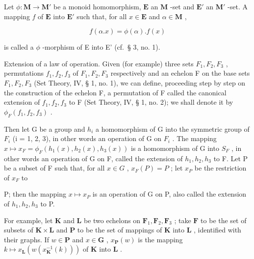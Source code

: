 Let \(\phi: \mathbf{M} \to \mathbf{M}'\) be a monoid homomorphism, \(\mathbf{E}\) an \(\mathbf{M}\) -set and \(\mathbf{E}'\) an \(\mathbf{M}'\) -set. A mapping \(f\) of \(\mathbf{E}\) into \(\mathbf{E}'\) such that, for all \(x \in \mathbf{E}\) and \(\alpha \in \mathbf{M}\) ,

\[
f (\alpha . x) = \phi (\alpha). f (x)
\]

is called a \(\phi\) -morphism of E into E' (cf.~§ 3, no. 1).

Extension of a law of operation. Given (for example) three sets \(F_{1}, F_{2}, F_{3}\) , permutations \(f_{1}, f_{2}, f_{3}\) of \(F_{1}, F_{2}, F_{3}\) respectively and an echelon F on the base sets \(F_{1}, F_{2}, F_{3}\) (Set Theory, IV, § 1, no. 1), we can define, proceeding step by step on the construction of the echelon F, a permutation of F called the canonical extension of \(f_{1}, f_{2}, f_{3}\) to F (Set Theory, IV, § 1, no. 2); we shall denote it by \(\phi_{F}(f_{1}, f_{2}, f_{3})\) .

Then let G be a group and \(h_{i}\) a homomorphism of G into the symmetric group of \(F_{i}\) (i = 1, 2, 3), in other words an operation of G on \(F_{i}\) . The mapping \(x \mapsto x_{F} = \phi_{F}(h_{1}(x), h_{2}(x), h_{3}(x))\) is a homomorphism of G into \(S_{F}\) , in other words an operation of G on F, called the extension of \(h_{1}, h_{2}, h_{3}\) to F. Let P be a subset of F such that, for all \(x \in G\) , \(x_{F}(P) = P\) ; let \(x_{P}\) be the restriction of \(x_{F}\) to

P; then the mapping \(x \mapsto x_{P}\) is an operation of G on P, also called the extension of \(h_{1}, h_{2}, h_{3}\) to P.

For example, let \(\mathbf{K}\) and \(\mathbf{L}\) be two echelons on \(\mathbf{F}_1, \mathbf{F}_2, \mathbf{F}_3\) ; take \(\mathbf{F}\) to be the set of subsets of \(\mathbf{K} \times \mathbf{L}\) and \(\mathbf{P}\) to be the set of mappings of \(\mathbf{K}\) into \(\mathbf{L}\) , identified with their graphs. If \(w \in \mathbf{P}\) and \(x \in \mathbf{G}\) , \(x_{\mathbf{P}}(w)\) is the mapping \(k \mapsto x_{\mathbf{L}}(w(x_{\mathbf{K}}^{-1}(k)))\) of \(\mathbf{K}\) into \(\mathbf{L}\) .

